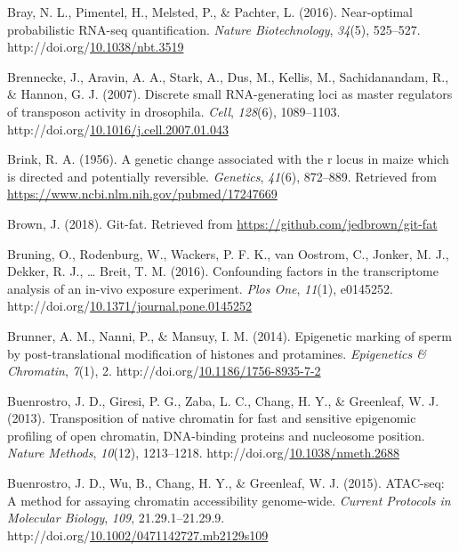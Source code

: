 \documentclass[12pt,twoside]{reedthesis}
\newlength{\cslhangindent}
\newenvironment{CSLReferences}[2] %
 {%
  \setlength{\parindent}{0pt}
  \ifodd #1 \everypar{\setlength{\hangindent}{\cslhangindent}}\ignorespaces\fi
  \ifnum #2 > 0
  \setlength{\parskip}{#2\baselineskip}
  \fi
 }%
 {}
\begin{document}
\begin{CSLReferences}{1}{0}
\leavevmode{}%
Bray, N. L., Pimentel, H., Melsted, P., \& Pachter, L. (2016). Near-optimal probabilistic RNA-seq quantification. \emph{Nature Biotechnology}, \emph{34}(5), 525--527. http://doi.org/\href{https://doi.org/10.1038/nbt.3519}{10.1038/nbt.3519}

\leavevmode{}%
Brennecke, J., Aravin, A. A., Stark, A., Dus, M., Kellis, M., Sachidanandam, R., \& Hannon, G. J. (2007). Discrete small RNA-generating loci as master regulators of transposon activity in drosophila. \emph{Cell}, \emph{128}(6), 1089--1103. http://doi.org/\href{https://doi.org/10.1016/j.cell.2007.01.043}{10.1016/j.cell.2007.01.043}

\leavevmode{}%
Brink, R. A. (1956). A genetic change associated with the r locus in maize which is directed and potentially reversible. \emph{Genetics}, \emph{41}(6), 872--889. Retrieved from \url{https://www.ncbi.nlm.nih.gov/pubmed/17247669}

\leavevmode{}%
Brown, J. (2018). Git-fat. Retrieved from \url{https://github.com/jedbrown/git-fat}

\leavevmode{}%
Bruning, O., Rodenburg, W., Wackers, P. F. K., van Oostrom, C., Jonker, M. J., Dekker, R. J., \ldots{} Breit, T. M. (2016). Confounding factors in the transcriptome analysis of an in-vivo exposure experiment. \emph{Plos One}, \emph{11}(1), e0145252. http://doi.org/\href{https://doi.org/10.1371/journal.pone.0145252}{10.1371/journal.pone.0145252}

\leavevmode{}%
Brunner, A. M., Nanni, P., \& Mansuy, I. M. (2014). Epigenetic marking of sperm by post-translational modification of histones and protamines. \emph{Epigenetics \& Chromatin}, \emph{7}(1), 2. http://doi.org/\href{https://doi.org/10.1186/1756-8935-7-2}{10.1186/1756-8935-7-2}

\leavevmode{}%
Buenrostro, J. D., Giresi, P. G., Zaba, L. C., Chang, H. Y., \& Greenleaf, W. J. (2013). Transposition of native chromatin for fast and sensitive epigenomic profiling of open chromatin, DNA-binding proteins and nucleosome position. \emph{Nature Methods}, \emph{10}(12), 1213--1218. http://doi.org/\href{https://doi.org/10.1038/nmeth.2688}{10.1038/nmeth.2688}

\leavevmode{}%
Buenrostro, J. D., Wu, B., Chang, H. Y., \& Greenleaf, W. J. (2015). ATAC-seq: A method for assaying chromatin accessibility genome-wide. \emph{Current Protocols in Molecular Biology}, \emph{109}, 21.29.1--21.29.9. http://doi.org/\href{https://doi.org/10.1002/0471142727.mb2129s109}{10.1002/0471142727.mb2129s109}


\end{CSLReferences}
\end{document}
